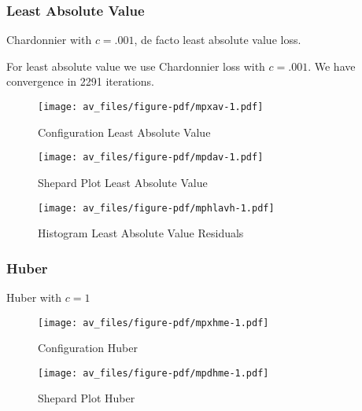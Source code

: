 \documentclass[
  12pt,
  letterpaper,
  DIV=11,
  numbers=noendperiod]{scrartcl}
\theoremstyle{plain}
\theoremstyle{remark}
\begin{document}
\subsubsection{Least Absolute Value}\label{least-absolute-value-1}

Chardonnier with \(c=.001\), de facto least absolute value loss.

For least absolute value we use Chardonnier loss with \(c=.001\). We
have convergence in 2291 iterations.

\begin{figure}[H]

{\centering \texttt{[image: av\_files/figure-pdf/mpxav-1.pdf]}

}

\caption{Configuration Least Absolute Value}

\end{figure}%

\begin{figure}[H]

{\centering \texttt{[image: av\_files/figure-pdf/mpdav-1.pdf]}

}

\caption{Shepard Plot Least Absolute Value}

\end{figure}%

\begin{figure}[H]

{\centering \texttt{[image: av\_files/figure-pdf/mphlavh-1.pdf]}

}

\caption{Histogram Least Absolute Value Residuals}

\end{figure}%

\subsubsection{Huber}\label{huber-2}

Huber with \(c=1\)

\begin{figure}[H]

{\centering \texttt{[image: av\_files/figure-pdf/mpxhme-1.pdf]}

}

\caption{Configuration Huber}

\end{figure}%

\begin{figure}[H]

{\centering \texttt{[image: av\_files/figure-pdf/mpdhme-1.pdf]}

}

\caption{Shepard Plot Huber}

\end{figure}%
\end{document}
